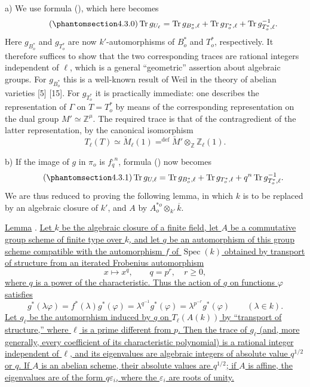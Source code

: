 \smallskip
\noindent
a) We use formula (), which here becomes
\begin{equation}\tag{\SGARefTarget{sga7.sga7i.eix.n4-3-0}{4.3.0}}
 \operatorname{Tr}g_{U_\ell}
 =\operatorname{Tr}g_{B^*_o,\ell}
 +\operatorname{Tr}g_{T^*_o,\ell}
 +\operatorname{Tr}g^{-1}_{T^*_o,\ell}.
\end{equation}
Here $g_{B^*_o}$ and $g_{T^*_o}$ are now $k'$-automorphisms of $B^*_o$
and $T^*_o$, respectively.  It therefore suffices to show that the two
corresponding traces are rational integers independent of $\ell$, which
is a general ``geometric'' assertion about algebraic groups.  For
$g_{B^*_o}$ this is a well-known result of Weil in the theory of abelian
varieties [5] [15].  For $g_{T^*_o}$ it is practically immediate: one
describes the representation of $\Gamma$ on $T=T^*_o$ by means of the
corresponding representation on the dual group $M'\simeq\mathbb Z^\mu$.
The required trace is that of the contragredient of the latter
representation, by the canonical isomorphism
\[
 T_\ell(T)\simeq\check M_\ell(1)
 \mathrel{\mathop{=}^{\mathrm{def}}}
 \check M'\otimes_{\mathbb Z}\mathbb Z_\ell(1).
\]

\smallskip
\noindent
b) If the image of $g$ in $\pi_o$ is $f_q^{,n}$, formula () now
becomes
\begin{equation}\tag{\SGARefTarget{sga7.sga7i.eix.n4-3-1}{4.3.1}}
 \operatorname{Tr}g_{U,\ell}
 =\operatorname{Tr}g_{B^*_o,\ell}
 +\operatorname{Tr}g_{T^*_o,\ell}
 +q^n\operatorname{Tr}g^{-1}_{T^*_o,\ell}.
\end{equation}
We are thus reduced to proving the following lemma, in which $k$ is to be
replaced by an algebraic closure of $k'$, and $A$ by
$A^{*o}_o\otimes_{k'}\overline k$.

\medskip
\noindent
\underline{Lemma} . \underline{Let $k$ be the algebraic closure of
a finite field, let $A$ be a commutative group scheme of finite type over
$k$, and let $g$ be an automorphism of this group scheme compatible with
the automorphism $f$ of $\operatorname{Spec}(k)$ obtained by transport of
structure from an iterated Frobenius automorphism}
\[
 x\longmapsto x^q,
 \qquad q=p^r,\quad r\geq0,
\]
\underline{where $q$ is a power of the characteristic.  Thus the action
of $g$ on functions $\varphi$ satisfies}
\[
 g^*(\lambda\varphi)=f^*(\lambda)g^*(\varphi)
 =\lambda^{q^{-1}}g^*(\varphi)
 =\lambda^{p^{-r}}g^*(\varphi)
 \qquad(\lambda\in k).
\]
\underline{Let $g_\ell$ be the automorphism induced by $g$ on
$T_\ell(A(k))$ by ``transport of structure,'' where $\ell$ is a prime
different from $p$.  Then the trace of $g_\ell$ (and, more generally,
every coefficient of its characteristic polynomial) is a rational
integer independent of $\ell$, and its eigenvalues are algebraic integers
of absolute value $q^{1/2}$ or $q$.  If $A$ is an abelian scheme, their
absolute values are $q^{1/2}$; if $A$ is affine, the eigenvalues are of
the form $q\varepsilon_i$, where the $\varepsilon_i$ are roots of unity.}

